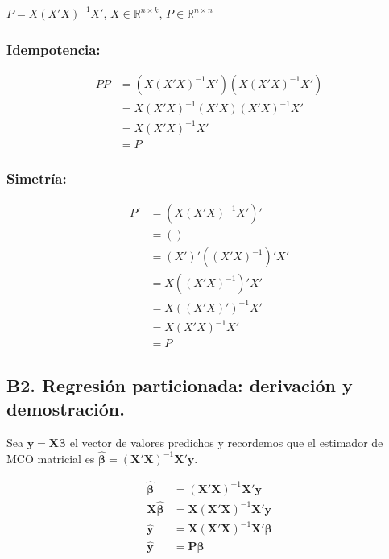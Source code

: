\documentclass[12pt, letter]{article}
\begin{document}
\( P = X (X'X)^{-1} X' \), \quad \( X \in \mathbb{R}^{n \times k} \), \quad \( P \in \mathbb{R}^{n \times n} \)

\subsubsection*{Idempotencia:}
\begin{align*}
P P &= \left( X (X'X)^{-1} X' \right) \left( X (X'X)^{-1} X' \right) \\
    &= X (X'X)^{-1} (X'X) (X'X)^{-1} X' \\
    &= X (X'X)^{-1} X' \\
    &= P
\end{align*}

\subsubsection*{Simetría:}
\begin{align*}
P' &= \left( X (X'X)^{-1} X' \right)' \\
   &= \left(  \right) \\
   &= \left( X' \right)' \left( (X'X)^{-1} \right)' X' \\
   &= X \left( (X'X)^{-1} \right)' X' \\
   &= X \left( (X'X)' \right)^{-1} X' \\
   &= X \left( X'X \right)^{-1} X' \\
   &= P
\end{align*}


\subsection{B2. Regresión particionada: derivación y demostración.}


Sea $\boldsymbol{y} = \boldsymbol{X}\boldsymbol{\beta}$ el vector de valores predichos y recordemos que el estimador de MCO matricial es $\boldsymbol{\hat{\beta}} = (\boldsymbol{X}'\boldsymbol{X})^{-1}\boldsymbol{X}'\boldsymbol{y}$. 

\begin{align*}
    \boldsymbol{\hat{\beta}} &= (\boldsymbol{X}'\boldsymbol{X})^{-1}\boldsymbol{X}'\boldsymbol{y} \\
    \boldsymbol{X}\boldsymbol{\hat{\beta}} &= \boldsymbol{X}(\boldsymbol{X}'\boldsymbol{X})^{-1}\boldsymbol{X}'\boldsymbol{y} \\
    \boldsymbol{\hat{y}} &= \boldsymbol{X}(\boldsymbol{X}'\boldsymbol{X})^{-1}\boldsymbol{X}'\boldsymbol{\beta} \\
    \boldsymbol{\hat{y}} &= \mathbf{P} \boldsymbol{\beta} \\


\end{align*}
\end{document}
